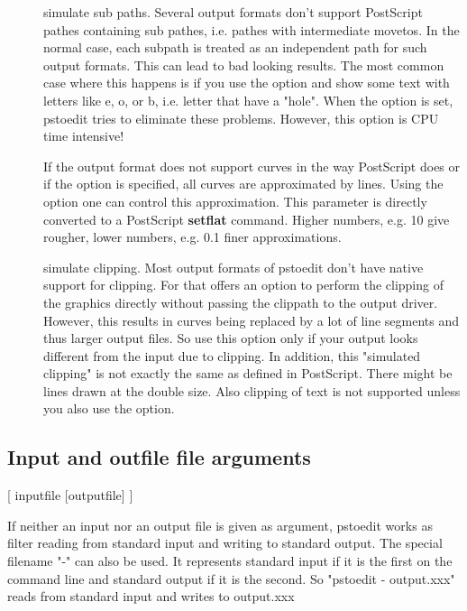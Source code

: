 \documentclass[english,a4paper]{article}
\begin{document}
\begin{description}
\item[] 
simulate sub paths. 
Several output formats don't support PostScript pathes containing sub pathes, i.e. pathes with intermediate movetos. In the normal case, each subpath is treated as an independent path for such output formats. This can lead to bad looking results. The most common case where this happens is if you use the  option and show some text with letters like e, o, or b, i.e. letter that have a "hole". When the  option is set, pstoedit tries to eliminate these problems. However, this option is CPU time intensive! 


\item[] 
If the output format does not support curves in the way PostScript does or if the  option is specified, all curves are approximated by lines. Using the  option one can control this approximation. This parameter is directly converted to a PostScript \textbf{setflat} command. Higher numbers, e.g. 10 give rougher, lower numbers, e.g. 0.1 finer approximations.  


\item[] 
simulate clipping.  
Most output formats of pstoedit don't have native support for clipping. For that  offers an option to perform the clipping of the graphics directly without passing the clippath to the output driver. However, this results in curves being replaced by a lot of line segments and thus larger output files. So use this option only if your output looks different from the input due to clipping. In addition, this "simulated clipping" is not exactly the same as defined in PostScript. There might be lines drawn at the double size. Also clipping of text is not supported unless you also use the  option.  


\end{description}
\subsection{Input and outfile file arguments}
[ inputfile [outputfile] ] 


If neither an input nor an output file is given as argument, pstoedit works as filter reading from standard input and
writing to standard output. 
The special filename "-" can also be used. It represents standard input if it is the first on the command line and standard output if it is the second. So "pstoedit - output.xxx" reads from standard input and writes to output.xxx
\end{document}

